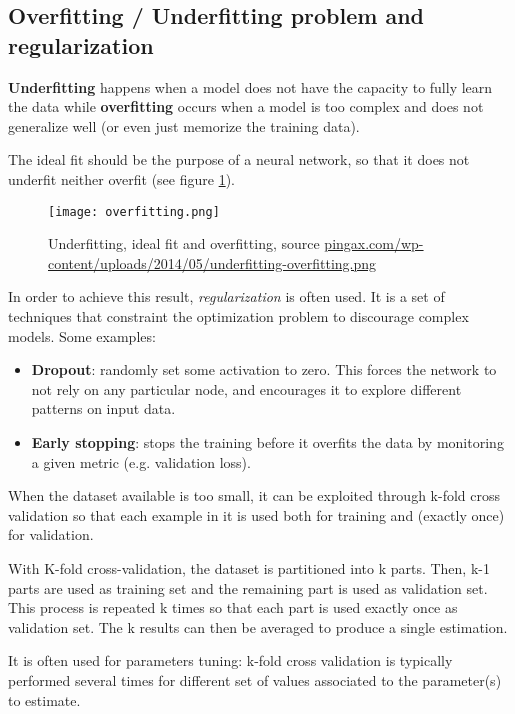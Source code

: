 \subsection{Overfitting / Underfitting problem and regularization}

\textbf{Underfitting} happens when a model does not have the capacity to fully learn the data while \textbf{overfitting} occurs when a model is too complex and does not generalize well (or even just memorize the training data).

The ideal fit should be the purpose of a neural network, so that it does not underfit neither overfit (see figure \ref{fig:overfitting}).

\begin{figure}[H]
  \centering
  \texttt{[image: overfitting.png]}
  \caption{Underfitting, ideal fit and overfitting, source \url{pingax.com/wp-content/uploads/2014/05/underfitting-overfitting.png}}
  \label{fig:overfitting}
\end{figure}

In order to achieve this result, \textit{regularization} is often used. It is a set of techniques that constraint the optimization problem to discourage complex models. Some examples:

\begin{itemize}
 \item \textbf{Dropout}: randomly set some activation to zero. This forces the network to not rely on any particular node, and encourages it to explore different patterns on input data.
 \item \textbf{Early stopping}: stops the training before it overfits the data by monitoring a given metric (e.g. validation loss).
\end{itemize}

When the dataset available is too small, it can be exploited through k-fold cross validation so that each example in it is used both for training and (exactly once) for validation.

With K-fold cross-validation, the dataset is partitioned into k parts. Then, k-1 parts are used as training set and the remaining part is used as validation set. This process is repeated k times so that each part is used exactly once as validation set.
The k results can then be averaged to produce a single estimation.

It is often used for parameters tuning: k-fold cross validation is typically performed several times for different set of values associated to the parameter(s) to estimate.

